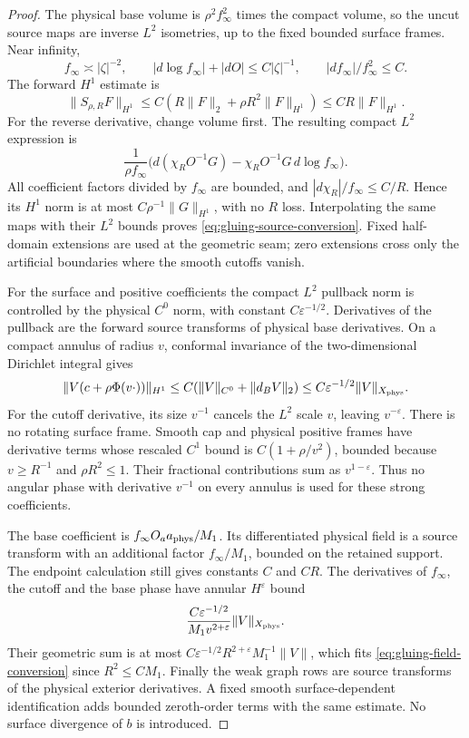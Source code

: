 \documentclass[11pt]{amsart}
\theoremstyle{definition}
\theoremstyle{remark}
\theoremstyle{plain}
\begin{document}
\begin{proof}
The physical base volume is $\rho^2f_\infty^2$ times the
compact volume, so the uncut source maps are inverse $L^2$
isometries, up to the fixed bounded surface frames. Near infinity,
\[
 f_\infty\asymp|\zeta|^{-2},\qquad
 |d\log f_\infty|+|dO|\leq C|\zeta|^{-1},\qquad
 |df_\infty|/f_\infty^2\leq C.
\]
The forward $H^1$ estimate is
\[
 \|S_{\rho,R}F\|_{H^1}
       \leq C(R\|F\|_2+\rho R^2\|F\|_{H^1})\leq CR\|F\|_{H^1}.
\]
For the reverse derivative, change volume first. The resulting
compact $L^2$ expression is
\[
 \frac1{\rho f_\infty}
       \bigl(d(\chi_RO^{-1}G)-\chi_RO^{-1}G\,d\log f_\infty\bigr).
\]
All coefficient factors divided by $f_\infty$ are bounded,
and $|d\chi_R|/f_\infty\leq C/R$. Hence its $H^1$ norm
is at most $C\rho^{-1}\|G\|_{H^1}$, with no $R$ loss.
Interpolating the same maps with their $L^2$ bounds proves
\eqref{eq:gluing-source-conversion}. Fixed half-domain extensions
are used at the geometric seam; zero extensions cross only the
artificial boundaries where the smooth cutoffs vanish.

For the surface and positive coefficients the compact $L^2$
pullback norm is controlled by the physical $C^0$ norm, with
constant $C\varepsilon^{-1/2}$. Derivatives of the pullback
are the forward source transforms of physical base derivatives.
On a compact annulus of radius $v$, conformal invariance of the
two-dimensional Dirichlet integral gives
\[
 \|V(c+\rho\Phi(v\cdot))\|_{H^1}
       \leq C(\|V\|_{C^0}+\|d_BV\|_2)
       \leq C\varepsilon^{-1/2}\|V\|_{X_{\rm phys}}.
\]
For the cutoff derivative, its size $v^{-1}$ cancels the
$L^2$ scale $v$, leaving $v^{-\varepsilon}$.
There is no rotating surface frame. Smooth cap and physical positive
frames have derivative terms whose rescaled $C^1$ bound is
$C(1+\rho/v^2)$, bounded because $v\geq R^{-1}$ and
$\rho R^2\leq1$. Their fractional contributions sum as
$v^{1-\varepsilon}$. Thus no angular phase with derivative
$v^{-1}$ on every annulus is used for these strong coefficients.

The base coefficient is $f_\infty O_a a_{\rm phys}/M_1$.
Its differentiated physical field is a source transform with an
additional factor $f_\infty/M_1$, bounded on the retained support.
The endpoint calculation still gives constants $C$ and $CR$.
The derivatives of $f_\infty$, the cutoff and the base phase
have annular $H^\varepsilon$ bound
\[
          \frac{C\varepsilon^{-1/2}}{M_1v^{2+\varepsilon}}
                                                   \|V\|_{X_{\rm phys}}.
\]
Their geometric sum is at most
$C\varepsilon^{-1/2}R^{2+\varepsilon}M_1^{-1}\|V\|$,
which fits \eqref{eq:gluing-field-conversion} since $R^2\leq CM_1$.
Finally the weak graph rows are source transforms of the physical
exterior derivatives. A fixed smooth surface-dependent identification
adds bounded zeroth-order terms with the same estimate. No surface
divergence of $b$ is introduced.
\end{proof}
\end{document}
